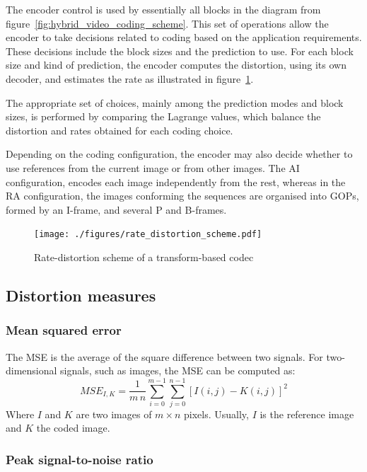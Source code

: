 \documentclass[11pt,a4paper,openright,twoside]{book}
\numberwithin{equation}{section} %
\numberwithin{figure}{section} %
\numberwithin{table}{section} %
\begin{document}
The encoder control is used by essentially all blocks in the diagram
from figure~\ref{fig:hybrid_video_coding_scheme}.
This set of operations allow the encoder to take decisions related to coding
based on the application requirements.
These decisions include the block sizes and the prediction to use.
For each block size and kind of prediction, the encoder computes the
distortion, using its own decoder, and estimates the rate as illustrated in
figure~\ref{fig:rate_distortion_scheme}.

The appropriate set of choices, mainly among the prediction modes and block
sizes, is performed by comparing the Lagrange values, which balance the
distortion and rates obtained for each coding choice.

Depending on the coding configuration, the encoder may also decide whether to
use references from the current image or from other images.
The \ac{AI} configuration, encodes each image independently from the rest,
whereas in the \ac{RA} configuration, the images conforming the sequences are
organised into \acp{GOP}, formed by an I-frame, and several P and B-frames.

\begin{figure}[tb]
	\centering
	\texttt{[image: ./figures/rate\_distortion\_scheme.pdf]}
	\caption{Rate-distortion scheme of a transform-based codec}
	\label{fig:rate_distortion_scheme}
\end{figure}

\subsection{Distortion measures}
\label{sub:distortion_measures}

\subsubsection{Mean squared error}
\label{ssub:mean_squared_error}

The \ac{MSE} is the average of the square difference between two
signals.
For two-dimensional signals, such as images, the \ac{MSE} can be computed as:
\begin{equation}
	MSE_{I,K} = \frac{1}{m\,n} \sum\limits_{i=0}^{m-1} \sum\limits_{j=0}^{n-1}
	{\left[ I(i,j) - K(i,j) \right]} ^2
	\label{eqn:mse}
\end{equation}
Where $I$ and $K$ are two images of $m \times n$ pixels.
Usually, $I$ is the reference image and $K$ the coded image.

\subsubsection{Peak signal-to-noise ratio}
\label{ssub:peak_signal_to_noise_ratio}
\end{document}
